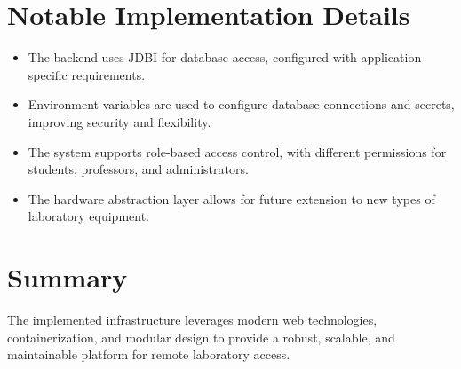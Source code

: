 \section{Notable Implementation Details}

\begin{itemize}
    \item The backend uses JDBI for database access, configured with application-specific requirements.
    \item Environment variables are used to configure database connections and secrets, improving security and flexibility.
    \item The system supports role-based access control, with different permissions for students, professors, and administrators.
    \item The hardware abstraction layer allows for future extension to new types of laboratory equipment.
\end{itemize}

\section{Summary}

The implemented infrastructure leverages modern web technologies, containerization, and modular design to provide a robust, scalable, and maintainable platform for remote laboratory access.